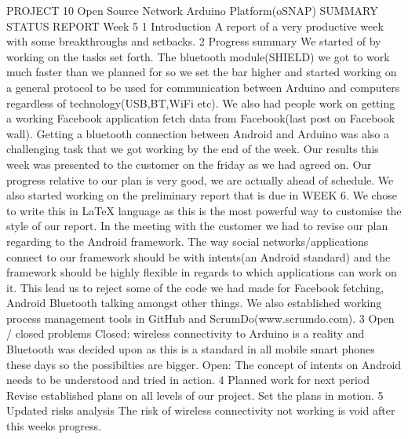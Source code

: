 PROJECT 10 Open Source Network Arduino Platform(oSNAP) SUMMARY STATUS
REPORT Week 5 1 Introduction A report of a very productive week with
some breakthroughs and setbacks. 2 Progress summary We started of
by working on the tasks set forth. The bluetooth module(SHIELD) we
got to work much faster than we planned for so we set the bar higher
and started working on a general protocol to be used for communication
between Arduino and computers regardless of technology(USB,BT,WiFi
etc). We also had people work on getting a working Facebook application
fetch data from Facebook(last post on Facebook wall). Getting a bluetooth
connection between Android and Arduino was also a challenging task
that we got working by the end of the week. Our results this week
was presented to the customer on the friday as we had agreed on. Our
progress relative to our plan is very good, we are actually ahead
of schedule. We also started working on the preliminary report that
is due in WEEK 6. We chose to write this in LaTeX language as this
is the most powerful way to customise the style of our report. In
the meeting with the customer we had to revise our plan regarding
to the Android framework. The way social networks/applications connect
to our framework should be with intents(an Android standard) and the
framework should be highly flexible in regards to which applications
can work on it. This lead us to reject some of the code we had made
for Facebook fetching, Android Bluetooth talking amongst other things.
We also established working process management tools in GitHub and
ScrumDo(www.scrumdo.com). 3 Open / closed problems Closed: wireless
connectivity to Arduino is a reality and Bluetooth was decided upon
as this is a standard in all mobile smart phones these days so the
possibilties are bigger. Open: The concept of intents on Android needs
to be understood and tried in action. 4 Planned work for next period
Revise established plans on all levels of our project. Set the plans
in motion. 5 Updated risks analysis The risk of wireless connectivity
not working is void after this weeks progress. 
